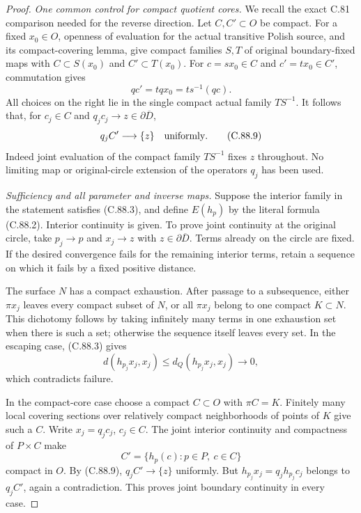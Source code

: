 \begin{proof}
\emph{One common control for compact quotient cores.}
We recall the exact C.81 comparison
needed for the reverse direction.
Let $C,C'\subset O$ be compact.
For a fixed $x_0\in O$, openness of
evaluation for the actual transitive
Polish source, and its compact-covering
lemma, give compact families $S,T$
of original boundary-fixed maps with
$C\subset S(x_0)$ and $C'\subset T(x_0)$.
For $c=sx_0\in C$ and $c'=tx_0\in C'$,
commutation gives
\[
          qc'=tqx_0=ts^{-1}(qc).
                                                                  \tag{C.88.8}
\]
All choices on the right lie in the
single compact actual family $TS^{-1}$.
It follows that, for $c_j\in C$ and
$q_jc_j\to z\in\partial\overline D$,
\[
                   q_j C'\longrightarrow\{z\}
                  \quad\hbox{uniformly}.                       \tag{C.88.9}
\]
Indeed joint evaluation of the compact
family $TS^{-1}$ fixes $z$ throughout.
No limiting map or original-circle
extension of the operators $q_j$
has been used.

\emph{Sufficiency and all parameter and inverse maps.}
Suppose the interior family in the
statement satisfies (C.88.3), and define
$E(h_p)$ by the literal formula (C.88.2).
Interior continuity is given. To prove
joint continuity at the original circle,
take $p_j\to p$ and $x_j\to z$ with
$z\in\partial\overline D$.
Terms already on the circle are fixed.
If the desired convergence fails for
the remaining interior terms, retain
a sequence on which it fails by a
fixed positive distance.

The surface $N$ has a compact exhaustion.
After passage to a subsequence, either
$\pi x_j$ leaves every compact subset
of $N$, or all $\pi x_j$ belong to
one compact $K\subset N$. This
dichotomy follows by taking infinitely
many terms in one exhaustion set when
there is such a set; otherwise the
sequence itself leaves every set.
In the escaping case, (C.88.3) gives
\[
             d(h_{p_j}x_j,x_j)
                  \leq d_Q(h_{p_j}x_j,x_j)\longrightarrow0,
                                                                  \tag{C.88.10}
\]
which contradicts failure.

In the compact-core case choose a
compact $C\subset O$ with $\pi C=K$.
Finitely many local covering sections
over relatively compact neighborhoods
of points of $K$ give such a $C$.
Write $x_j=q_jc_j$, $c_j\in C$.
The joint interior continuity and
compactness of $P\times C$ make
\[
                 C'=\{h_p(c):p\in P,\ c\in C\}
                                                                  \tag{C.88.11}
\]
compact in $O$. By (C.88.9),
$q_j C'\to\{z\}$ uniformly.
But $h_{p_j}x_j=q_jh_{p_j}c_j$
belongs to $q_j C'$, again a
contradiction. This proves joint
boundary continuity in every case.


\end{proof}
